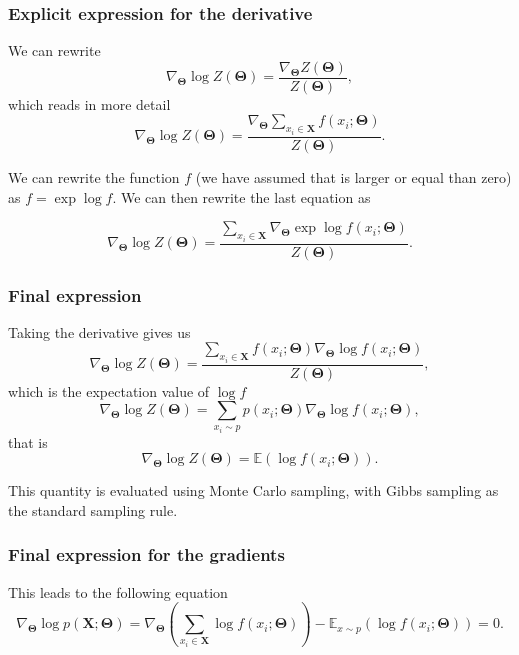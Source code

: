 \documentclass{beamer}
\begin{document}
\begin{frame}
\frametitle{Explicit expression for the derivative}

We can rewrite
\[
\nabla_{\bm{\Theta}}\log{Z(\bm{\Theta})}=\frac{\nabla_{\bm{\Theta}}Z(\bm{\Theta})}{Z(\bm{\Theta})},
\]
which reads in more detail
\[
\nabla_{\bm{\Theta}}\log{Z(\bm{\Theta})}=\frac{\nabla_{\bm{\Theta}} \sum_{x_i\in \bm{X}}f(x_i;\bm{\Theta})   }{Z(\bm{\Theta})}.
\]

We can rewrite the function $f$ (we have assumed that is larger or
equal than zero) as $f=\exp{\log{f}}$. We can then rewrite the last
equation as

\[
\nabla_{\bm{\Theta}}\log{Z(\bm{\Theta})}=\frac{ \sum_{x_i\in \bm{X}} \nabla_{\bm{\Theta}}\exp{\log{f(x_i;\bm{\Theta})}}   }{Z(\bm{\Theta})}.
\]
\end{frame}

\begin{frame}
\frametitle{Final expression}

Taking the derivative gives us
\[
\nabla_{\bm{\Theta}}\log{Z(\bm{\Theta})}=\frac{ \sum_{x_i\in \bm{X}}f(x_i;\bm{\Theta}) \nabla_{\bm{\Theta}}\log{f(x_i;\bm{\Theta})}   }{Z(\bm{\Theta})}, 
\]
which is the expectation value of $\log{f}$
\[
\nabla_{\bm{\Theta}}\log{Z(\bm{\Theta})}=\sum_{x_i\sim p}p(x_i;\bm{\Theta}) \nabla_{\bm{\Theta}}\log{f(x_i;\bm{\Theta})},
\]
that is
\[
\nabla_{\bm{\Theta}}\log{Z(\bm{\Theta})}=\mathbb{E}(\log{f(x_i;\bm{\Theta})}).
\]

This quantity is evaluated using Monte Carlo sampling, with Gibbs
sampling as the standard sampling rule.
\end{frame}

\begin{frame}
\frametitle{Final expression for the gradients}

This leads to the following equation
\[
\nabla_{\bm{\Theta}}\log{p(\bm{X};\bm{\Theta})}=\nabla_{\bm{\Theta}}\left(\sum_{x_i\in \bm{X}}\log{f(x_i;\bm{\Theta})}\right)-\mathbb{E}_{x\sim p}(\log{f(x_i;\bm{\Theta})})=0.
\]
\end{frame}
\end{document}
